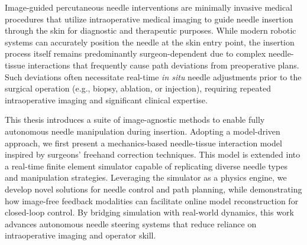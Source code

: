 




Image-guided percutaneous needle interventions are minimally invasive medical procedures that utilize intraoperative medical imaging to guide needle insertion through the skin for diagnostic and therapeutic purposes. While modern robotic systems can accurately position the needle at the skin entry point, the insertion process itself remains predominantly surgeon-dependent due to complex needle-tissue interactions that frequently cause path deviations from preoperative plans. Such deviations often necessitate real-time \textit{in situ} needle adjustments prior to the surgical operation (e.g., biopsy, ablation, or injection), requiring repeated intraoperative imaging and significant clinical expertise.

This thesis introduces a suite of image-agnostic methods to enable fully autonomous needle manipulation during insertion. Adopting a model-driven approach, we first present a mechanics-based needle-tissue interaction model inspired by surgeons' freehand correction techniques. This model is extended into a real-time finite element simulator capable of replicating diverse needle types and manipulation strategies. Leveraging the simulator as a physics engine, we develop novel solutions for needle control and path planning, while demonstrating how image-free feedback modalities can facilitate online model reconstruction for closed-loop control. By bridging simulation with real-world dynamics, this work advances autonomous needle steering systems that reduce reliance on intraoperative imaging and operator skill.

